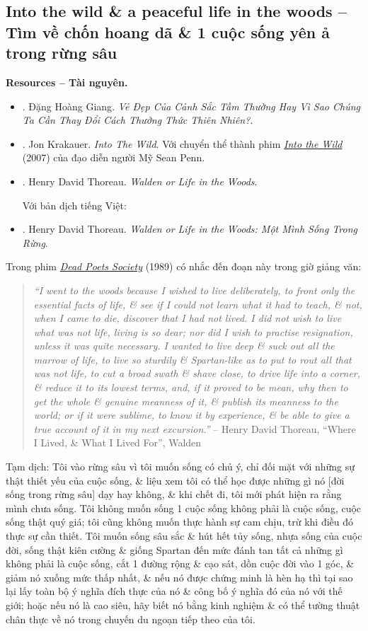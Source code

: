 \documentclass[12pt]{article}
\begin{document}
\subsection{Into the wild \& a peaceful life in the woods -- Tìm về chốn hoang dã \& 1 cuộc sống yên ả trong rừng sâu}
\textbf{\textsf{Resources -- Tài nguyên.}}
\begin{itemize}
	\item \cite{Giang_nature}. {\sc Đặng Hoàng Giang}. {\it Vẻ Đẹp Của Cảnh Sắc Tầm Thường Hay Vì Sao Chúng Ta Cần Thay Đổi Cách Thưởng Thức Thiên Nhiên?}.
	\item \cite{Krakauer_wild}. {\sc Jon Krakauer}. {\it Into The Wild}. Với chuyển thể thành phim \href{https://www.imdb.com/title/tt0758758}{\it Into the Wild} (2007) của đạo diễn người Mỹ {\sc Sean Penn}.
	\item \cite{Thoreau_Walden}. {\sc Henry David Thoreau}. {\it Walden or Life in the Woods}.
	
	Với bản dịch tiếng Việt:
	\item \cite{Thoreau_Walden_VN}. {\sc Henry David Thoreau}. {\it Walden or Life in the Woods: Một Mình Sống Trong Rừng}.
\end{itemize}
Trong phim \href{https://www.imdb.com/title/tt0097165}{\it Dead Poets Society} (1989) có nhắc đến đoạn này trong giờ giảng văn:
\begin{quotation}
	{\it``I went to the woods because I wished to live deliberately, to front only the essential facts of life, \& see if I could not learn what it had to teach, \& not, when I came to die, discover that I had not lived. I did not wish to live what was not life, living is so dear; nor did I wish to practise resignation, unless it was quite necessary. I wanted to live deep \& suck out all the marrow of life, to live so sturdily \& Spartan-like as to put to rout all that was not life, to cut a broad swath \& shave close, to drive life into a corner, \& reduce it to its lowest terms, and, if it proved to be mean, why then to get the whole \& genuine meanness of it, \& publish its meanness to the world; or if it were sublime, to know it by experience, \& be able to give a true account of it in my next excursion.''} -- {\sc Henry David Thoreau}, ``Where I Lived, \& What I Lived For'', Walden \cite{Thoreau_Walden}
\end{quotation}
{\sf Tạm dịch}: Tôi vào rừng sâu vì tôi muốn sống có chủ ý, chỉ đối mặt với những sự thật thiết yếu của cuộc sống, \& liệu xem tôi có thể học được những gì nó [đời sống trong rừng sâu] dạy hay không, \& khi chết đi, tôi mới phát hiện ra rằng mình chưa sống. Tôi không muốn sống 1 cuộc sống không phải là cuộc sống, cuộc sống thật quý giá; tôi cũng không muốn thực hành sự cam chịu, trừ khi điều đó thực sự cần thiết. Tôi muốn sống sâu sắc \& hút hết tủy sống, nhựa sống của cuộc đời, sống thật kiên cường \& giống Spartan đến mức đánh tan tất cả những gì không phải là cuộc sống, cắt 1 đường rộng \& cạo sát, dồn cuộc đời vào 1 góc, \& giảm nó xuống mức thấp nhất, \& nếu nó được chứng minh là hèn hạ thì tại sao lại lấy toàn bộ ý nghĩa đích thực của nó \& công bố ý nghĩa đó của nó với thế giới; hoặc nếu nó là cao siêu, hãy biết nó bằng kinh nghiệm \& có thể tường thuật chân thực về nó trong chuyến du ngoạn tiếp theo của tôi.
\end{document}
